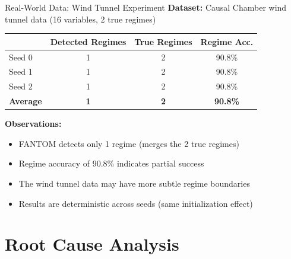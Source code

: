 \documentclass[aspectratio=169]{beamer}
\begin{document}
\begin{frame}{Real-World Data: Wind Tunnel Experiment}
\textbf{Dataset:} Causal Chamber wind tunnel data (16 variables, 2 true regimes)

\vspace{0.3cm}
\begin{table}
\centering
\begin{tabular}{l|ccc}
\toprule
& \textbf{Detected Regimes} & \textbf{True Regimes} & \textbf{Regime Acc.} \\
\midrule
Seed 0 & 1 & 2 & 90.8\% \\
Seed 1 & 1 & 2 & 90.8\% \\
Seed 2 & 1 & 2 & 90.8\% \\
\midrule
\textbf{Average} & \textbf{1} & \textbf{2} & \textbf{90.8\%} \\
\bottomrule
\end{tabular}
\end{table}

\vspace{0.3cm}
\textbf{Observations:}
\begin{itemize}
    \item FANTOM detects only 1 regime (merges the 2 true regimes)
    \item Regime accuracy of 90.8\% indicates partial success
    \item The wind tunnel data may have more subtle regime boundaries
    \item Results are deterministic across seeds (same initialization effect)
\end{itemize}
\end{frame}

\section{Root Cause Analysis}
\end{document}
